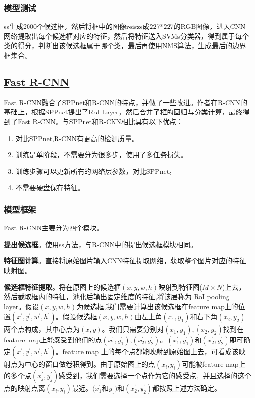 \documentclass[]{article}
\begin{document}
\subsubsection{模型测试}
ss生成2000个候选框，然后将框中的图像reisze成227*227的RGB图像，进入CNN网络提取出每个候选框对应的特征，然后将特征送入SVMs分类器，得到属于每个类的得分，判断出该候选框属于哪个类，最后再使用NMS算法，生成最后的边界框集合。

\subsection{\href{./papers/Fast R-CNN.pdf}{Fast R-CNN}}
Fast R-CNN融合了SPPnet和R-CNN的特点，并做了一些改进。作者在R-CNN的基础上，根据SPPnet提出了RoI Layer，然后合并了框的回归与分类计算，最终得到了Fast R-CNN。与SPPnet和R-CNN相比具有以下优点：
\begin{enumerate}
	\item 对比SPPnet,R-CNN有更高的检测质量。
	\item 训练是单阶段，不需要分为很多步，使用了多任务损失。
	\item 训练步骤可以更新所有的网络层参数，对比SPPnet。
	\item 不需要硬盘保存特征。
\end{enumerate}
\subsubsection{模型框架}
Fast R-CNN主要分为四个模块。

\textbf{提出候选框}。使用ss方法，与R-CNN中的提出候选框模块相同。

\textbf{特征图计算}。直接将原始图片输入CNN特征提取网络，获取整个图片对应的特征映射图。

\textbf{候选框特征提取}。将在原图上的候选框$(x,y,w,h)$映射到特征图($M \times N$)上去，然后截取框内的特征，池化后输出固定维度的特征,将该层称为 RoI pooling layer。假设$(x,y,w,h)$为候选框,我们需要计算出该候选框在feature map上的位置$(x^{'},y^{'} ,w^{'} ,h^{'})$。假设候选框$(x,y,w,h)$由左上角$(x_1,y_1)$和右下角$(x_2,y_2)$两个点构成，其中心点为$(\bar{x},\bar{y})$。我们只需要分别对$(x_1,y_1),(x_2,y_2)$找到在feature map上能感受到他们的点$(x_1^{'} ,y_1^{'})$,$(x_2^{'} ,y_2^{'})$。$(x_1^{'} ,y_1^{'})$和$(x_2^{'} ,y_2^{'})$即可确定$(x^{'},y^{'} ,w^{'} ,h^{'})$。feature map 上的每个点都能映射到原始图上去，可看成该映射点为中心的窗口做卷积得到。由于原始图上的点$(x_i,y_i)$可能被feature map上的多个点$(x_j^{'},y_j^{'})$感受到，我们需要选择一个点作为它的感受点，并且选择的这个点的映射点离$(x_i,y_i)$最近。$(x_1^{'} $和$y_1^{'})$和$(x_2^{'} ,y_2^{'})$都按照上述方法确定。
\end{document}
